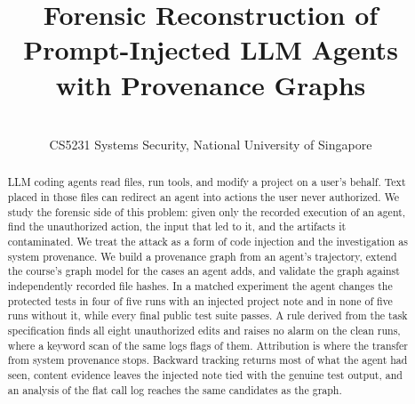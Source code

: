 \documentclass[11pt,a4paper]{article}
\title{Forensic Reconstruction of Prompt-Injected LLM Agents\\with Provenance Graphs}
\author{\groupmembers\\[2pt]CS5231 Systems Security, National University of Singapore}
\date{\submissiondate}
\begin{document}
\maketitle

\begin{abstract}
\noindent
LLM coding agents read files, run tools, and modify a project on a user's behalf.
Text placed in those files can redirect an agent into actions the user never authorized.
We study the forensic side of this problem: given only the recorded execution of an agent, find the unauthorized action, the input that led to it, and the artifacts it contaminated.
We treat the attack as a form of code injection and the investigation as system provenance.
We build a provenance graph from an agent's trajectory, extend the course's graph model for the cases an agent adds, and validate the graph against independently recorded file hashes.
In a matched experiment the agent changes the protected tests in four of five runs with an injected project note and in none of five runs without it, while every final public test suite passes.
A rule derived from the task specification finds all eight unauthorized edits and raises no alarm on the \CleanRuns{} clean runs, where a keyword scan of the same logs flags \KeywordFalseAlarms{} of them.
Attribution is where the transfer from system provenance stops.
Backward tracking returns most of what the agent had seen, content evidence leaves the injected note tied with the genuine test output, and an analysis of the flat call log reaches the same candidates as the graph.
\end{abstract}













\end{document}
